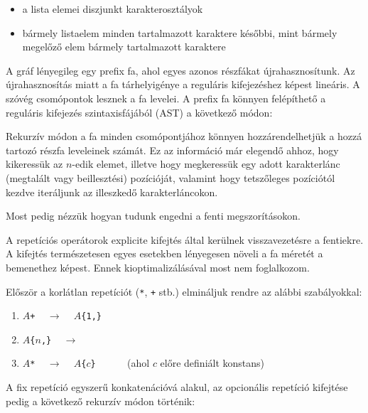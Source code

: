 \documentclass[
    parspace,
    noindent,
    nohyp,
]{elteiktdk}[2023/04/10]
\begin{document}
\begin{itemize}
    \item a lista elemei diszjunkt karakterosztályok
    \item bármely listaelem minden tartalmazott karaktere későbbi, mint bármely megelőző elem bármely tartalmazott karaktere
\end{itemize}


A gráf lényegileg egy prefix fa, ahol egyes azonos részfákat újrahasznosítunk.
Az újrahasznosítás miatt a fa tárhelyigénye a reguláris kifejezéshez képest lineáris.
A szóvég csomópontok lesznek a fa levelei.
A prefix fa könnyen felépíthető a reguláris kifejezés szintaxisfájából (AST)
a következő módon:


Rekurzív módon a fa minden csomópontjához könnyen hozzárendelhetjük
a hozzá tartozó részfa leveleinek számát.
Ez az információ már elegendő ahhoz, hogy kikeressük az $n$-edik elemet,
illetve hogy megkeressük egy adott karakterlánc (megtalált vagy beillesztési) pozícióját,
valamint hogy tetszőleges pozíciótól kezdve iteráljunk az illeszkedő karakterláncokon.


Most pedig nézzük hogyan tudunk engedni a fenti megszorításokon.

A repetíciós operátorok explicite kifejtés által kerülnek visszavezetésre a fentiekre.
A kifejtés természetesen egyes esetekben lényegesen növeli a fa méretét a bemenethez képest.
Ennek kioptimalizálásával most nem foglalkozom.

Először a korlátlan repetíciót (\texttt{*}, \texttt{+} stb.) elmináljuk rendre az alábbi szabályokkal:

\begin{enumerate}
    \item \texttt{$A$+} ~ $\longrightarrow$ ~ \texttt{$A$\{1,\}}
    \item \texttt{$A$\{$n$,\}} ~ $\longrightarrow$ ~ 
    \item \texttt{$A$*} ~ $\longrightarrow$ ~ \texttt{$A$\{$c$\}} ~~~~~ (ahol $c$ előre definiált konstans)
\end{enumerate}

A fix repetíció egyszerű konkatenációvá alakul,
az opcionális repetíció kifejtése pedig a következő rekurzív módon történik:
\end{document}
